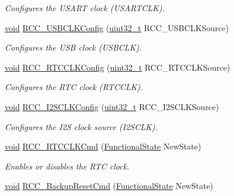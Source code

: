 \begin{DoxyCompactItemize}
\begin{DoxyCompactList}\small\item\em Configures the U\-S\-A\-R\-T clock (U\-S\-A\-R\-T\-C\-L\-K). \end{DoxyCompactList}\item 
\hyperlink{group___n_a_m_e_ga18028b8badbf1ea7e704ccac3c488e82}{void} \hyperlink{group___r_c_c___group3_ga895b3ff3d143c990f1cd0146aa260081}{R\-C\-C\-\_\-\-U\-S\-B\-C\-L\-K\-Config} (\hyperlink{stdint_8h_a435d1572bf3f880d55459d9805097f62}{uint32\-\_\-t} R\-C\-C\-\_\-\-U\-S\-B\-C\-L\-K\-Source)
\begin{DoxyCompactList}\small\item\em Configures the U\-S\-B clock (U\-S\-B\-C\-L\-K). \end{DoxyCompactList}\item 
\hyperlink{group___n_a_m_e_ga18028b8badbf1ea7e704ccac3c488e82}{void} \hyperlink{group___r_c_c___group3_ga1473d8a5a020642966359611c44181b0}{R\-C\-C\-\_\-\-R\-T\-C\-C\-L\-K\-Config} (\hyperlink{stdint_8h_a435d1572bf3f880d55459d9805097f62}{uint32\-\_\-t} R\-C\-C\-\_\-\-R\-T\-C\-C\-L\-K\-Source)
\begin{DoxyCompactList}\small\item\em Configures the R\-T\-C clock (R\-T\-C\-C\-L\-K). \end{DoxyCompactList}\item 
\hyperlink{group___n_a_m_e_ga18028b8badbf1ea7e704ccac3c488e82}{void} \hyperlink{group___r_c_c___group3_ga6c56f8529988fcc8f4dbffbc1bab27d0}{R\-C\-C\-\_\-\-I2\-S\-C\-L\-K\-Config} (\hyperlink{stdint_8h_a435d1572bf3f880d55459d9805097f62}{uint32\-\_\-t} R\-C\-C\-\_\-\-I2\-S\-C\-L\-K\-Source)
\begin{DoxyCompactList}\small\item\em Configures the I2\-S clock source (I2\-S\-C\-L\-K). \end{DoxyCompactList}\item 
\hyperlink{group___n_a_m_e_ga18028b8badbf1ea7e704ccac3c488e82}{void} \hyperlink{group___r_c_c___group3_ga9802f84846df2cea8e369234ed13b159}{R\-C\-C\-\_\-\-R\-T\-C\-C\-L\-K\-Cmd} (\hyperlink{group___exported__types_gac9a7e9a35d2513ec15c3b537aaa4fba1}{Functional\-State} New\-State)
\begin{DoxyCompactList}\small\item\em Enables or disables the R\-T\-C clock. \end{DoxyCompactList}\item 
\hyperlink{group___n_a_m_e_ga18028b8badbf1ea7e704ccac3c488e82}{void} \hyperlink{group___r_c_c___group3_ga636c3b72f35391e67f12a551b15fa54a}{R\-C\-C\-\_\-\-Backup\-Reset\-Cmd} (\hyperlink{group___exported__types_gac9a7e9a35d2513ec15c3b537aaa4fba1}{Functional\-State} New\-State)

\end{DoxyCompactItemize}
